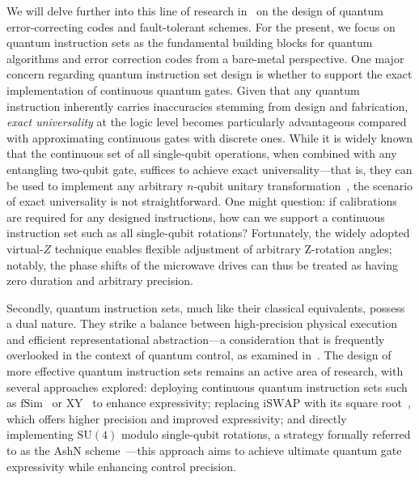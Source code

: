 \documentclass[a4paper,onecolumn,11pt,unpublished]{quantumarticle}
\begin{document}
We will delve further into this line of research in~ on the design of quantum error-correcting codes and fault-tolerant schemes. For the present, we focus on quantum instruction sets as the fundamental building blocks for quantum algorithms and error correction codes from a bare-metal perspective.
One major concern regarding quantum instruction set design is whether to support the exact implementation of continuous quantum gates. Given that any quantum instruction inherently carries inaccuracies stemming from design and fabrication, \textit{exact universality} at the logic level becomes particularly advantageous compared with approximating continuous gates with discrete ones.
While it is widely known that the continuous set of all single-qubit operations, when combined with any entangling two-qubit gate, suffices to achieve exact universality---that is, they can be used to implement any arbitrary $n$-qubit unitary transformation~\cite{harrow2008exact}, the scenario of exact universality is not straightforward. One might question: if calibrations are required for any designed instructions, how can we support a continuous instruction set such as all single-qubit rotations? Fortunately, the widely adopted virtual-$Z$ technique enables flexible adjustment of arbitrary Z-rotation angles; notably, the phase shifts of the microwave drives can thus be treated as having zero duration and arbitrary precision.

Secondly, quantum instruction sets, much like their classical equivalents, possess a dual nature. They strike a balance between high-precision physical execution and efficient representational abstraction---a consideration that is frequently overlooked in the context of quantum control, as examined in~. The design of more effective quantum instruction sets remains an active area of research, with several approaches explored: deploying continuous quantum instruction sets such as $\textrm{fSim}$~\cite{Foxen2020Demonstrating} or $\textrm{XY}$~\cite{Abrams2020Implementation} to enhance expressivity; replacing $\textrm{iSWAP}$ with its square root~\cite{Huang2023Quantum}, which offers higher precision and improved expressivity; and directly implementing $\textrm{SU}(4)$ modulo single-qubit rotations, a strategy formally referred to as the AshN scheme~\cite{Chen2024One}---this approach aims to achieve ultimate quantum gate expressivity while enhancing control precision.
\end{document}
